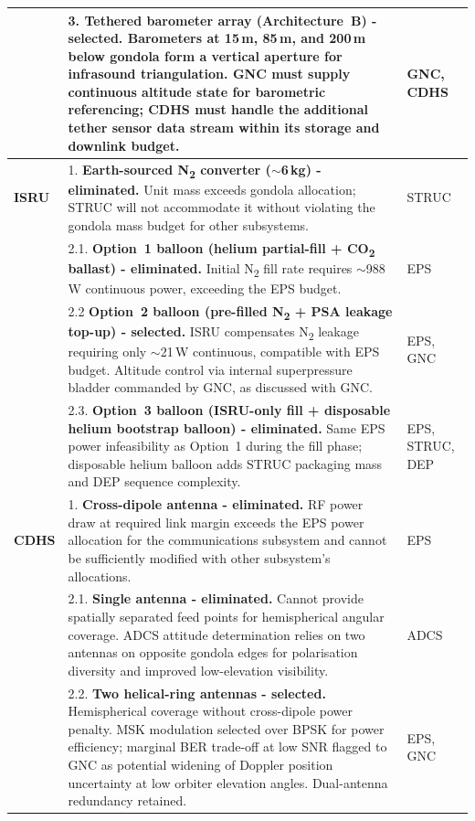 {\begin{longtable}{@{} p{1.8cm} p{11cm} p{2.5cm} @{}}
&
3. \textbf{Tethered barometer array (Architecture~B) - selected.} Barometers at 15\,m, 85\,m, and 200\,m below gondola form a vertical aperture for infrasound triangulation. GNC must supply continuous altitude state for barometric referencing; CDHS must handle the additional tether sensor data stream within its storage and downlink budget.
& GNC, CDHS \\[6pt]
\midrule
\textbf{ISRU} &
1. \textbf{Earth-sourced N\textsubscript{2} converter ($\sim$6\,kg) - eliminated.} Unit mass exceeds gondola allocation; STRUC will not accommodate it without violating the gondola mass budget for other subsystems.
& STRUC \\[6pt]

&
2.1. \textbf{Option~1 balloon (helium partial-fill + CO\textsubscript{2} ballast) - eliminated.} Initial N\textsubscript{2} fill rate requires $\sim$988\,W continuous power, exceeding the EPS budget.
& EPS \\[6pt]

&
2.2 \textbf{Option~2 balloon (pre-filled N\textsubscript{2} + PSA leakage top-up) - selected.} ISRU compensates N\textsubscript{2} leakage requiring only $\sim$21\,W continuous, compatible with EPS budget. Altitude control via internal superpressure bladder commanded by GNC, as discussed with GNC.
& EPS, GNC \\[6pt]

&
2.3. \textbf{Option~3 balloon (ISRU-only fill + disposable helium bootstrap balloon) - eliminated.} Same EPS power infeasibility as Option~1 during the fill phase; disposable helium balloon adds STRUC packaging mass and DEP sequence complexity.
& EPS, STRUC, DEP \\[6pt]
\midrule
\textbf{CDHS} &
1. \textbf{Cross-dipole antenna - eliminated.} RF power draw at required link margin exceeds the EPS power allocation for the communications subsystem and cannot be sufficiently modified with other subsystem's allocations.
& EPS \\[6pt]

&
2.1. \textbf{Single antenna - eliminated.} Cannot provide spatially separated feed points for hemispherical angular coverage. ADCS attitude determination relies on two antennas on opposite gondola edges for polarisation diversity and improved low-elevation visibility.
& ADCS \\[6pt]

&
2.2. \textbf{Two helical-ring antennas - selected.} Hemispherical coverage without cross-dipole power penalty. MSK modulation selected over BPSK for power efficiency; marginal BER trade-off at low SNR flagged to GNC as potential widening of Doppler position uncertainty at low orbiter elevation angles. Dual-antenna redundancy retained.
& EPS, GNC \\[6pt]


\end{longtable}}
